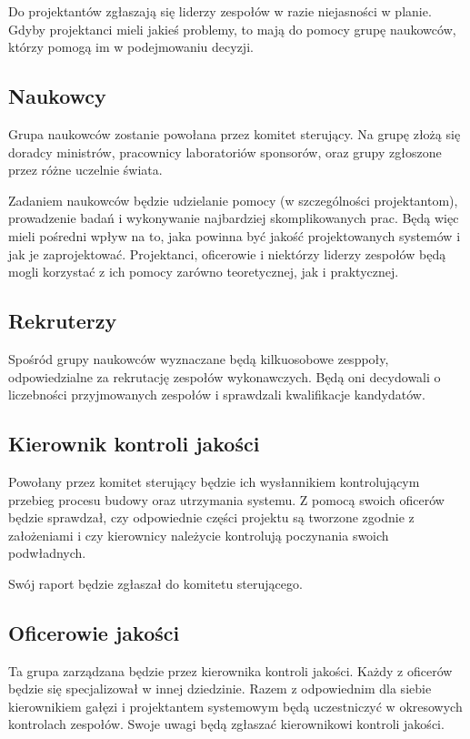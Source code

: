 Do projektantów zgłaszają się liderzy zespołów w razie niejasności w planie.
Gdyby projektanci mieli jakieś problemy, to mają do pomocy grupę naukowców, którzy pomogą im w podejmowaniu decyzji.

\subsection{Naukowcy}
Grupa naukowców zostanie powołana przez komitet sterujący.
Na grupę złożą się doradcy ministrów, pracownicy laboratoriów sponsorów, oraz grupy zgłoszone przez różne uczelnie świata.

Zadaniem naukowców będzie udzielanie pomocy (w szczególności projektantom), prowadzenie badań i wykonywanie najbardziej skomplikowanych prac. 
Będą więc mieli pośredni wpływ na to, jaka powinna być jakość projektowanych systemów i jak je zaprojektować.
Projektanci, oficerowie i niektórzy liderzy zespołów będą mogli korzystać z ich pomocy zarówno teoretycznej, jak i praktycznej.

\subsection{Rekruterzy}
Spośród grupy naukowców wyznaczane będą kilkuosobowe zesppoły, odpowiedzialne za rekrutację zespołów wykonawczych. Będą oni decydowali o liczebności przyjmowanych zespołów i sprawdzali kwalifikacje kandydatów.

\subsection{Kierownik kontroli jakości}
Powołany przez komitet sterujący będzie ich wysłannikiem kontrolującym przebieg procesu budowy oraz utrzymania systemu.
Z pomocą swoich oficerów będzie sprawdzał, czy odpowiednie części projektu są tworzone zgodnie z założeniami i czy kierownicy należycie kontrolują poczynania swoich podwładnych.

Swój raport będzie zgłaszał do komitetu sterującego.

\subsection{Oficerowie jakości}
Ta grupa zarządzana będzie przez kierownika kontroli jakości.
Każdy z oficerów będzie się specjalizował w innej dziedzinie.
Razem z odpowiednim dla siebie kierownikiem gałęzi i projektantem systemowym będą uczestniczyć w okresowych kontrolach zespołów.
Swoje uwagi będą zgłaszać kierownikowi kontroli jakości.


